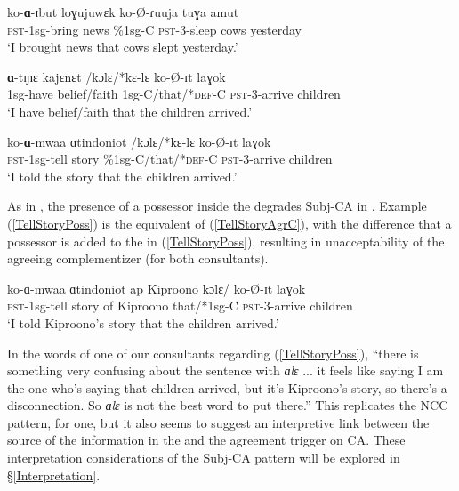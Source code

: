 \documentclass[output=paper
,newtxmath
,modfonts
,nonflat]{langsci/langscibook}
\begin{document}
\ea 
\begin{xlist}

\ex 
\gll ko-\textbf{ɑ}-ɪbut loɣujuwɛk  ko-\O-ɾuuja tuɣa amut \\
\textsc{pst}-1sg-bring news \%1sg-C \textsc{pst}-3-sleep cows yesterday\\
\glt `I brought news that cows slept yesterday.' 

\ex
\gll \textbf{ɑ}-tɪɲɛ kajɛnɛt /kɔlɛ/*kɛ-lɛ ko-\O-ɪt laɣok \\
1sg-have belief/faith 1sg-C/that/*\textsc{def}-C \textsc{pst}-3-arrive children \\
\glt `I have belief/faith that the children arrived.'

\ex \label{TellStoryAgrC}
\gll ko-\textbf{ɑ}-mwaa ɑtindoniot /kɔlɛ/*kɛ-lɛ ko-\O-ɪt laɣok \\
\textsc{pst}-1sg-tell story \%1sg-C/that/*\textsc{def}-C \textsc{pst}-3-arrive children \\
\glt `I told the story that the children arrived.'

\end{xlist}
\z

\noindent As in , the presence of a possessor inside the  degrades Subj-CA in . Example (\ref{TellStoryPoss}) is the equivalent of (\ref{TellStoryAgrC}), with the difference that a possessor is added to the  in (\ref{TellStoryPoss}), resulting in unacceptability of the agreeing complementizer (for both consultants).

\ea \label{TellStoryPoss}

\gll ko-ɑ-mwaa ɑtindoniot ap Kiproono kɔlɛ/ ko-\O-ɪt laɣok \\
\textsc{pst}-1sg-tell story of Kiproono that/*1sg-C \textsc{pst}-3-arrive children \\
\glt `I told Kiproono's story that the children arrived.'

\z

\noindent In the words of one of our consultants regarding (\ref{TellStoryPoss}), ``there is something very confusing about the sentence with \textit{ɑlɛ} ... it feels like saying I am the one who's saying that children arrived, but it's Kiproono's story, so there's a disconnection. So \textit{ɑlɛ} is not the best word to put there.'' This replicates the  NCC pattern, for one, but it also seems to suggest an interpretive link between the source of the information in the  and the agreement trigger on CA. These interpretation considerations of the Subj-CA pattern will be explored in \S \ref{Interpretation}.
\end{document}
